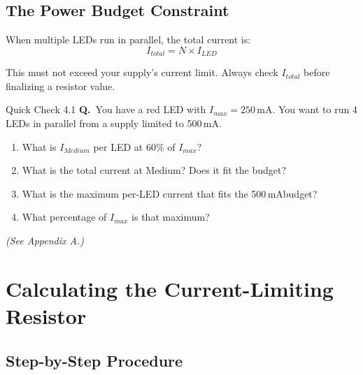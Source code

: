 \documentclass[11pt,letterpaper]{article}
\newcommand{\mA}{\,\si{mA}}
\newcommand{\Imax}{I_{max}}
\newcommand{\Iled}{I_{LED}}
\newcounter{quiz}
\newcommand{\quizq}{\stepcounter{quiz}\textbf{Q\thequiz.}~}
\begin{document}
\subsection{The Power Budget Constraint}

When multiple LEDs run in parallel, the total current is:
\begin{equation}
  I_{total} = N \times \Iled
  \label{eq:itotal}
\end{equation}

This must not exceed your supply's current limit. Always check $I_{total}$ before
finalizing a resistor value.

\begin{quizbox}{Quick Check 4.1}
\quizq You have a red LED with $\Imax = 250$\mA. You want to run 4 LEDs in parallel
from a supply limited to 500\mA.
\begin{enumerate}[label=(\alph*), leftmargin=2.5em]
  \item What is $I_{Medium}$ per LED at 60\% of $\Imax$?
  \item What is the total current at Medium? Does it fit the budget?
  \item What is the maximum per-LED current that fits the 500\mA budget?
  \item What percentage of $\Imax$ is that maximum?
\end{enumerate}
\textit{(See Appendix A.)}
\end{quizbox}

\section{Calculating the Current-Limiting Resistor}

\subsection{Step-by-Step Procedure}
\end{document}
